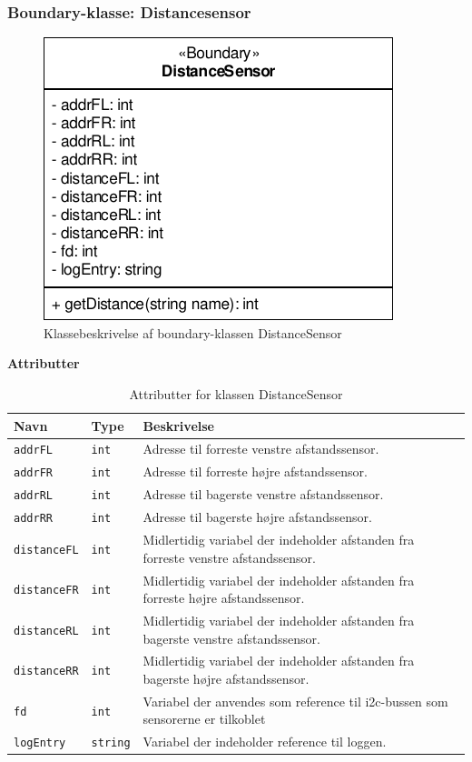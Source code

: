 \subsubsection{Boundary-klasse: Distancesensor}

\begin{figure}[h]
\centering
\includegraphics[]{../fig/diagrammer/bil/cd_distancesensor.pdf}
\caption{Klassebeskrivelse af boundary-klassen DistanceSensor}
\label{fig:cd_distancesensor}
\end{figure}

\textbf{Attributter}

\begin{table}[h]
\begin{tabularx}{\textwidth}{| Z | Z | L{10cm} |} \hline
Navn & Type & Beskrivelse \\\hline
\texttt{addrFL} & \texttt{int} &Adresse til forreste venstre afstandssensor.\\\hline
\texttt{addrFR} & \texttt{int} &Adresse til forreste højre afstandssensor.\\\hline
\texttt{addrRL} & \texttt{int} &Adresse til bagerste venstre afstandssensor.\\\hline
\texttt{addrRR} & \texttt{int} &Adresse til bagerste højre afstandssensor.\\\hline
\texttt{distanceFL} & \texttt{int} &Midlertidig variabel der indeholder afstanden fra forreste venstre afstandssensor.\\\hline
\texttt{distanceFR} & \texttt{int} &Midlertidig variabel der indeholder afstanden fra forreste højre afstandssensor.\\\hline
\texttt{distanceRL} & \texttt{int} &Midlertidig variabel der indeholder afstanden fra bagerste venstre afstandssensor.\\\hline
\texttt{distanceRR} & \texttt{int} &Midlertidig variabel der indeholder afstanden fra bagerste højre afstandssensor.\\\hline
\texttt{fd} & \texttt{int} &Variabel der anvendes som reference til i2c-bussen som sensorerne er tilkoblet\\\hline
\texttt{logEntry} & \texttt{string} &Variabel der indeholder reference til loggen.\\\hline
\end{tabularx}
\caption{Attributter for klassen DistanceSensor}
\label{table:attr_distancesensor}
\end{table}

